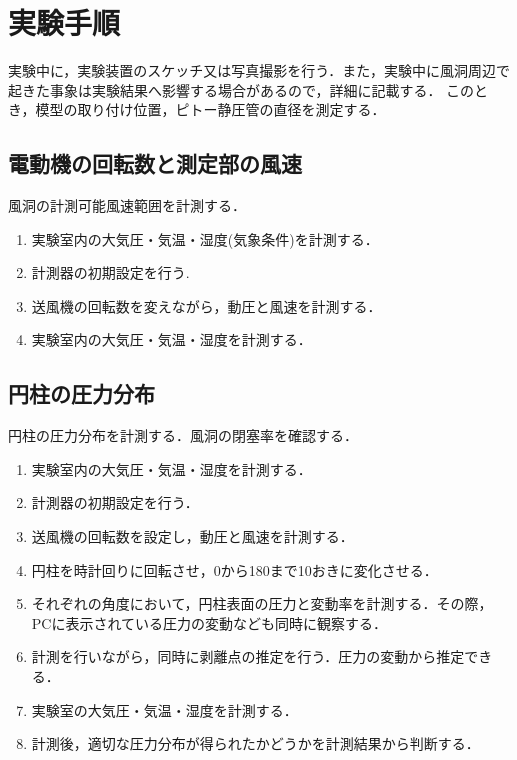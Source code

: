 \documentclass[a4paper,titlepage]{ltjsarticle}
\begin{document}
\section{実験手順}
実験中に，実験装置のスケッチ又は写真撮影を行う．また，実験中に風洞周辺で
起きた事象は実験結果へ影響する場合があるので，詳細に記載する．
このとき，模型の取り付け位置，ピトー静圧管の直径を測定する．

\subsection{電動機の回転数と測定部の風速}
風洞の計測可能風速範囲を計測する．
\begin{enumerate}
  \item 実験室内の大気圧・気温・湿度(気象条件)を計測する．
  \item 計測器の初期設定を行う.
  \item 送風機の回転数を変えながら，動圧と風速を計測する．
  \item 実験室内の大気圧・気温・湿度を計測する．
\end{enumerate}

\subsection{円柱の圧力分布}
円柱の圧力分布を計測する．風洞の閉塞率を確認する．
\begin{enumerate}
  \item 実験室内の大気圧・気温・湿度を計測する．
  \item 計測器の初期設定を行う．
  \item 送風機の回転数を設定し，動圧と風速を計測する．
  \item 円柱を時計回りに回転させ，0{\textdegree}から180{\textdegree}まで10{\textdegree}おきに変化させる．
  \item それぞれの角度において，円柱表面の圧力と変動率を計測する．その際，PCに表示されている圧力の変動なども同時に観察する．
  \item 計測を行いながら，同時に剥離点の推定を行う．圧力の変動から推定できる．
  \item 実験室の大気圧・気温・湿度を計測する．
  \item 計測後，適切な圧力分布が得られたかどうかを計測結果から判断する．
\end{enumerate}
\end{document}
